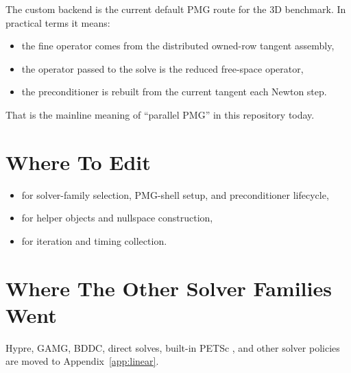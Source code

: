 The custom  backend is the current default PMG route for the
3D benchmark. In practical terms it means:
\begin{itemize}
\item the fine operator comes from the distributed owned-row tangent assembly,
\item the operator passed to the solve is the reduced free-space operator,
\item the preconditioner is rebuilt from the current tangent each Newton step.
\end{itemize}

That is the mainline meaning of ``parallel PMG'' in this repository today.

\section{Where To Edit}

\begin{itemize}
\item {} for solver-family selection, PMG-shell setup,
and preconditioner lifecycle,
\item {} for helper objects and nullspace
construction,
\item {} for iteration and timing collection.
\end{itemize}

\section{Where The Other Solver Families Went}

Hypre, GAMG, BDDC, direct solves, built-in PETSc , and other solver
policies are moved to Appendix~\ref{app:linear}.
